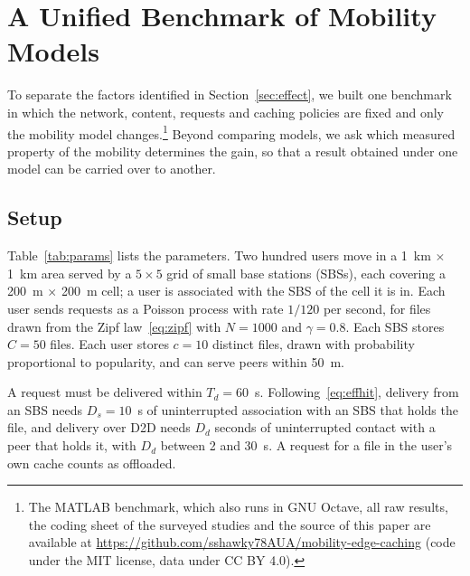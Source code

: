 
\section{A Unified Benchmark of Mobility Models}
\label{sec:benchmark}

To separate the factors identified in Section~\ref{sec:effect}, we built one benchmark in which the network, content, requests and caching policies are fixed and only the mobility model changes.\footnote{The MATLAB benchmark, which also runs in GNU Octave, all raw results, the coding sheet of the surveyed studies and the source of this paper are available at \url{https://github.com/sshawky78AUA/mobility-edge-caching} (code under the MIT license, data under CC BY 4.0).} Beyond comparing models, we ask which measured property of the mobility determines the gain, so that a result obtained under one model can be carried over to another.

\subsection{Setup}
\label{subsec:setup}

Table~\ref{tab:params} lists the parameters. Two hundred users move in a 1~km $\times$ 1~km area served by a $5\times5$ grid of small base stations (SBSs), each covering a 200~m $\times$ 200~m cell; a user is associated with the SBS of the cell it is in. Each user sends requests as a Poisson process with rate $1/120$ per second, for files drawn from the Zipf law~\eqref{eq:zipf} with $N=1000$ and $\gamma=0.8$. Each SBS stores $C=50$ files. Each user stores $c=10$ distinct files, drawn with probability proportional to popularity, and can serve peers within 50~m.

A request must be delivered within $T_d=60$~s. Following~\eqref{eq:effhit}, delivery from an SBS needs $D_s=10$~s of uninterrupted association with an SBS that holds the file, and delivery over D2D needs $D_d$ seconds of uninterrupted contact with a peer that holds it, with $D_d$ between 2 and 30~s. A request for a file in the user's own cache counts as offloaded.

